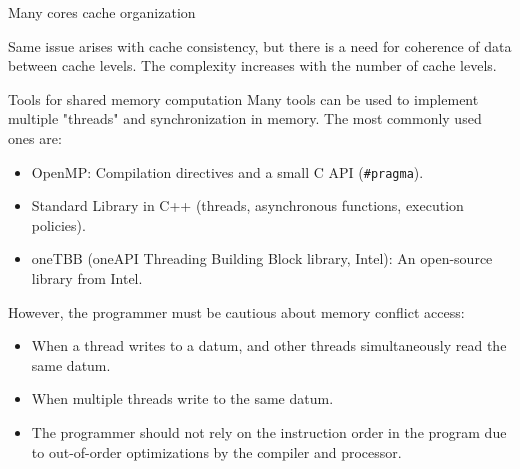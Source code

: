 \documentclass[compress,10pt,aspectratio=169]{beamer}
\begin{document}
\begin{frame}[fragile]{Many cores cache organization}
\begin{center}
        \end{center}
        
        Same issue arises with cache consistency, but there is a need for coherence of data between cache levels. The complexity increases with the number of cache levels.
        
        \end{frame}


\begin{frame}[fragile]{Tools for shared memory computation}
\small
Many tools can be used to implement multiple "threads" and synchronization in memory. The most commonly used ones are:

\begin{itemize}
    \item OpenMP: Compilation directives and a small C API (\texttt{#pragma}).
    \item Standard Library in C++ (threads, asynchronous functions, execution policies).
    \item oneTBB (oneAPI Threading Building Block library, Intel): An open-source library from Intel.
\end{itemize}

However, the programmer must be cautious about memory conflict access:

\begin{itemize}
    \item When a thread writes to a datum, and other threads simultaneously read the same datum.
    \item When multiple threads write to the same datum.
    \item The programmer should not rely on the instruction order in the program due to out-of-order optimizations by the compiler and processor.
\end{itemize}
\end{frame}
\end{document}
